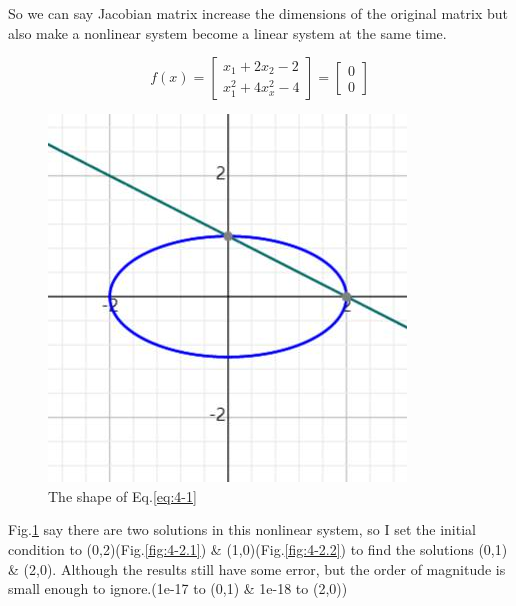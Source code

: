 \documentclass{article}
\begin{document}
So we can say Jacobian matrix increase the dimensions of the original matrix but also make a nonlinear system become a linear system at the same time.

\begin{equation}
   f(x)=\begin{bmatrix}
    x_1+2x_2-2\\ 
    x_1^2+4x_x^2-4
    \end{bmatrix}
    =
    \begin{bmatrix}
    0\\ 
    0
    \end{bmatrix} 
    \label{eq:4-1}
\end{equation}


\begin{figure}[h]
    \centering 
	\includegraphics[scale=0.3]{pro4-1.jpg}
	\caption{The shape of Eq.\ref{eq:4-1}}
	\label{fig:4-1} %
\end{figure}

Fig.\ref{fig:4-1} say there are two solutions in this nonlinear system, so I set the initial condition to (0,2)(Fig.\ref{fig:4-2.1}) \& (1,0)(Fig.\ref{fig:4-2.2}) to find the solutions (0,1) \& (2,0). Although the results still have some error, but the order of magnitude is small enough to ignore.(1e-17 to (0,1) \& 1e-18 to (2,0))
\end{document}
